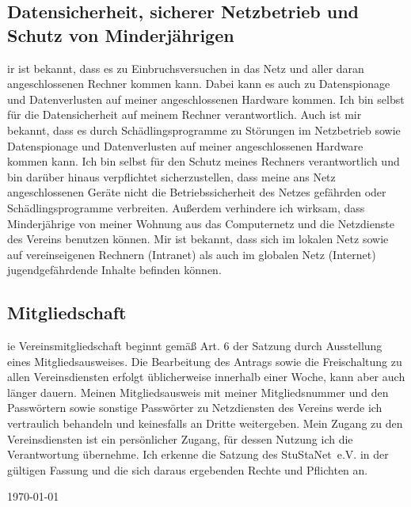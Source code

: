 \documentclass[a4paper,10pt]{scrartcl}
\begin{document}
\subsection*{Datensicherheit, sicherer Netzbetrieb und Schutz von Minderjährigen}
ir ist bekannt, dass es zu Einbruchsversuchen in das Netz und aller daran angeschlossenen Rechner kommen kann. Dabei kann es auch zu Datenspionage und Datenverlusten auf meiner angeschlossenen Hardware kommen. Ich bin selbst für die Datensicherheit auf meinem Rechner verantwortlich. Auch ist mir bekannt, dass es durch Schädlingsprogramme zu Störungen im Netzbetrieb sowie Datenspionage und Datenverlusten auf meiner angeschlossenen Hardware kommen kann. Ich bin selbst für den Schutz meines Rechners verantwortlich und bin darüber hinaus verpflichtet sicherzustellen, dass meine ans Netz angeschlossenen Geräte nicht die Betriebssicherheit des Netzes gefährden oder Schädlingsprogramme verbreiten. Außerdem verhindere ich wirksam, dass Minderjährige von meiner Wohnung aus das Computernetz und die Netzdienste des Vereins benutzen können. Mir ist bekannt, dass sich im lokalen Netz sowie auf vereinseigenen Rechnern (Intranet) als auch im globalen Netz (Internet) jugendgefährdende Inhalte befinden können.

\subsection*{Mitgliedschaft}
ie Vereinsmitgliedschaft beginnt gemäß Art. 6 der Satzung durch Ausstellung eines Mitgliedsausweises. Die Bearbeitung des Antrags sowie die Freischaltung zu allen Vereinsdiensten erfolgt üblicherweise innerhalb einer Woche, kann aber auch länger dauern. Meinen Mitgliedsausweis mit meiner Mitgliedsnummer und den Passwörtern sowie sonstige Passwörter zu Netzdiensten des Vereins werde ich vertraulich behandeln und keinesfalls an Dritte weitergeben. Mein Zugang zu den Vereinsdiensten ist ein persönlicher Zugang, für dessen Nutzung ich die Verantwortung übernehme. Ich erkenne die Satzung des StuStaNet~e.V. in der gültigen Fassung und die sich daraus ergebenden Rechte und Pflichten an.

\enlargethispage{40pt}
\medskip

\hfill\today

\newpage

\end{document}
